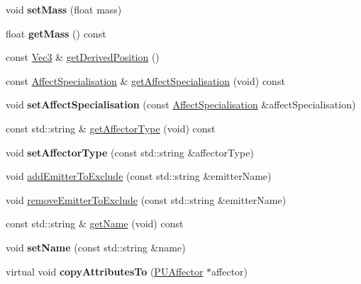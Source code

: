 \begin{DoxyCompactItemize}
\mbox{\label{classPUAffector_a191d219a3602625008064b5fa20e21ad}} 
void {\bfseries set\+Mass} (float mass)
\item 
\mbox{\label{classPUAffector_a2422d91e069a09b3ff66efe7afff13b2}} 
float {\bfseries get\+Mass} () const
\item 
const \hyperlink{classVec3}{Vec3} \& \hyperlink{classPUAffector_a2230dd7430d9586cb922626c93b6bb79}{get\+Derived\+Position} ()
\item 
const \hyperlink{classPUAffector_aa4e8045ac29ee020895fd3e386935013}{Affect\+Specialisation} \& \hyperlink{classPUAffector_a96326f08d83ecd04391412acf9642dd5}{get\+Affect\+Specialisation} (void) const
\item 
\mbox{\label{classPUAffector_a01ac5c5a60f7ed1ef22d97665808cf5b}} 
void {\bfseries set\+Affect\+Specialisation} (const \hyperlink{classPUAffector_aa4e8045ac29ee020895fd3e386935013}{Affect\+Specialisation} \&affect\+Specialisation)
\item 
const std\+::string \& \hyperlink{classPUAffector_ad3a61fcbb1b3f0c38363aad914389e0c}{get\+Affector\+Type} (void) const
\item 
\mbox{\label{classPUAffector_ad8ce665da2249f93fbc2d50ab0c1390c}} 
void {\bfseries set\+Affector\+Type} (const std\+::string \&affector\+Type)
\item 
void \hyperlink{classPUAffector_aaf379b616eb066ce9535a56c1c4bd4cd}{add\+Emitter\+To\+Exclude} (const std\+::string \&emitter\+Name)
\item 
void \hyperlink{classPUAffector_a3656722deeec360894ccb7637b597516}{remove\+Emitter\+To\+Exclude} (const std\+::string \&emitter\+Name)
\item 
const std\+::string \& \hyperlink{classPUAffector_af5f6499f64032484591415629a1caea1}{get\+Name} (void) const
\item 
\mbox{\label{classPUAffector_ada781a8003fec4801edaead5f4a23878}} 
void {\bfseries set\+Name} (const std\+::string \&name)
\item 
\mbox{\label{classPUAffector_a9c5c001d705170193a8a3cfee286f0dc}} 
virtual void {\bfseries copy\+Attributes\+To} (\hyperlink{classPUAffector}{P\+U\+Affector} $\ast$affector)
\end{DoxyCompactItemize}
